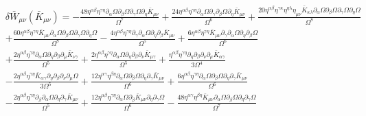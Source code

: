 \documentclass[10pt,letterpaper]{article}
\begin{document}
\begin{align}
	&\delta \bar W_{\mu\nu}(\bar K_{\mu\nu}) = 
- \frac{48 \eta^{\alpha \beta} \eta^{\gamma \eta} \partial_{\alpha}\Omega \partial_{\beta}\Omega \partial_{\gamma}\Omega \partial_{\eta}\bar{K}_{\mu \nu}}{\Omega^7} + \frac{24 \eta^{\alpha \beta} \eta^{\gamma \eta} \partial_{\alpha}\Omega \partial_{\gamma}\partial_{\beta}\Omega \partial_{\eta}\bar{K}_{\mu \nu}}{\Omega^6} + \frac{20 \eta^{\alpha \beta} \eta^{\gamma \kappa} \eta^{\eta \lambda} \eta_{\mu \nu} \bar{K}_{\kappa \lambda} \partial_{\alpha}\Omega \partial_{\beta}\Omega \partial_{\gamma}\Omega \partial_{\eta}\Omega}{\Omega^8}  \nonumber \\
 &+ \frac{60 \eta^{\alpha \beta} \eta^{\gamma \eta} \bar{K}_{\mu \nu} \partial_{\alpha}\Omega \partial_{\beta}\Omega \partial_{\gamma}\Omega \partial_{\eta}\Omega}{\Omega^8} -  \frac{4 \eta^{\alpha \beta} \eta^{\gamma \eta} \partial_{\gamma}\partial_{\alpha}\Omega \partial_{\eta}\partial_{\beta}\bar{K}_{\mu \nu}}{\Omega^5} + \frac{6 \eta^{\alpha \beta} \eta^{\gamma \eta} \bar{K}_{\mu \nu} \partial_{\gamma}\partial_{\alpha}\Omega \partial_{\eta}\partial_{\beta}\Omega}{\Omega^6} \nonumber \\
&+ \frac{2 \eta^{\alpha \beta} \eta^{\gamma \eta} \partial_{\alpha}\Omega \partial_{\eta}\partial_{\beta}\partial_{\mu}\bar{K}_{\nu \gamma}}{\Omega^5} + \frac{2 \eta^{\alpha \beta} \eta^{\gamma \eta} \partial_{\alpha}\Omega \partial_{\eta}\partial_{\beta}\partial_{\nu}\bar{K}_{\mu \gamma}}{\Omega^5} + \frac{\eta^{\alpha \beta} \eta^{\gamma \eta} \partial_{\eta}\partial_{\beta}\partial_{\nu}\partial_{\mu}\bar{K}_{\alpha \gamma}}{3 \Omega^4} \nonumber \\
&-  \frac{2 \eta^{\alpha \beta} \eta^{\gamma \eta} \bar{K}_{\alpha \gamma} \partial_{\eta}\partial_{\beta}\partial_{\nu}\partial_{\mu}\Omega}{3 \Omega^5} + \frac{12 \eta^{\alpha \gamma} \eta^{\beta \eta} \partial_{\alpha}\Omega \partial_{\beta}\Omega \partial_{\eta}\partial_{\gamma}\bar{K}_{\mu \nu}}{\Omega^6} + \frac{6 \eta^{\alpha \beta} \eta^{\gamma \eta} \partial_{\alpha}\Omega \partial_{\beta}\Omega \partial_{\eta}\partial_{\gamma}\bar{K}_{\mu \nu}}{\Omega^6} \nonumber \\
&-  \frac{2 \eta^{\alpha \beta} \eta^{\gamma \eta} \partial_{\beta}\partial_{\alpha}\Omega \partial_{\eta}\partial_{\gamma}\bar{K}_{\mu \nu}}{\Omega^5} + \frac{12 \eta^{\alpha \beta} \eta^{\gamma \eta} \partial_{\alpha}\Omega \partial_{\beta}\bar{K}_{\mu \nu} \partial_{\eta}\partial_{\gamma}\Omega}{\Omega^6} -  \frac{48 \eta^{\alpha \gamma} \eta^{\beta \eta} \bar{K}_{\mu \nu} \partial_{\alpha}\Omega \partial_{\beta}\Omega \partial_{\eta}\partial_{\gamma}\Omega}{\Omega^7} \nonumber \\

\end{align}
\end{document}
